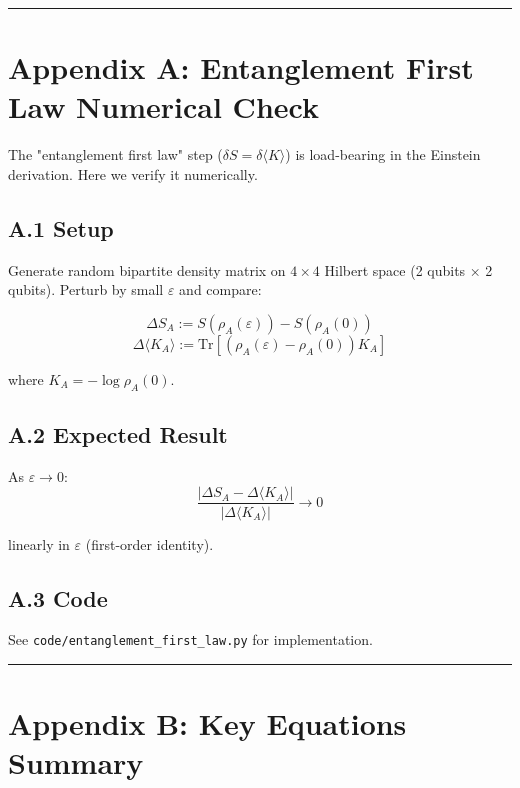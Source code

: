 \begin{center}\rule{0.5\linewidth}{0.5pt}\end{center}

\section{Appendix A: Entanglement First Law Numerical Check}\label{appendix-a-entanglement-first-law-numerical-check}

The "entanglement first law" step (\(\delta S = \delta\langle K \rangle\)) is load-bearing in the Einstein derivation. Here we verify it numerically.

\subsection{A.1 Setup}\label{a1-setup}

Generate random bipartite density matrix on \(4 \times 4\) Hilbert space (2 qubits × 2 qubits). Perturb by small \(\varepsilon\) and compare:

\[\Delta S_A := S(\rho_A(\varepsilon)) - S(\rho_A(0))\] \[\Delta\langle K_A \rangle := \text{Tr}[(\rho_A(\varepsilon) - \rho_A(0)) K_A]\]

where \(K_A = -\log \rho_A(0)\).

\subsection{A.2 Expected Result}\label{a2-expected-result}

As \(\varepsilon \to 0\): \[\frac{|\Delta S_A - \Delta\langle K_A \rangle|}{|\Delta\langle K_A \rangle|} \to 0\]

linearly in \(\varepsilon\) (first-order identity).

\subsection{A.3 Code}\label{a3-code}

See \texttt{code/entanglement\_first\_law.py} for implementation.

\begin{center}\rule{0.5\linewidth}{0.5pt}\end{center}

\section{Appendix B: Key Equations Summary}\label{appendix-b-key-equations-summary}

